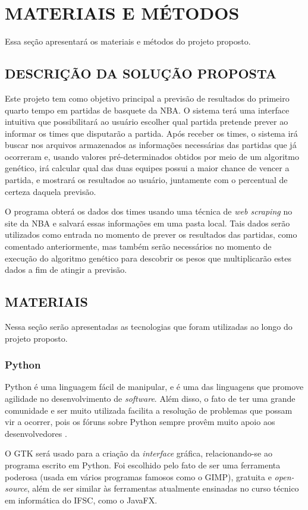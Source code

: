 \documentclass[brazilian]{ifsc-tcc}
\begin{document}
\chapter{MATERIAIS E MÉTODOS}
Essa seção apresentará os materiais e métodos do projeto proposto. 

\section{DESCRIÇÃO DA SOLUÇÃO PROPOSTA}
Este projeto tem como objetivo principal a previsão de resultados do primeiro quarto tempo em partidas de basquete da NBA. O sistema terá uma interface intuitiva que possibilitará ao usuário escolher qual partida pretende prever ao informar os times que disputarão a partida. Após receber os times, o sistema irá buscar nos arquivos armazenados as informações necessárias das partidas que já ocorreram e, usando valores pré-determinados obtidos por meio de um algoritmo genético, irá calcular qual das duas equipes possui a maior chance de vencer a partida, e mostrará os resultados ao usuário, juntamente com o percentual de certeza daquela previsão.

O programa obterá os dados dos times usando uma técnica de \textit{web scraping} no site da NBA e salvará essas informações em uma pasta local. Tais dados serão utilizados como entrada no momento de prever os resultados das partidas, como comentado anteriormente, mas também serão necessários no momento de execução do algoritmo genético para descobrir os pesos que multiplicarão estes dados a fim de atingir a previsão.

\section{MATERIAIS}
Nessa seção serão apresentadas as tecnologias que foram utilizadas ao longo do projeto proposto.

\subsection{Python}

Python é uma linguagem fácil de manipular, e é uma das linguagens que promove agilidade no desenvolvimento de \textit{software}. Além disso, o fato de ter uma grande comunidade e ser muito utilizada facilita a resolução de problemas que possam vir a ocorrer, pois os fóruns sobre Python sempre provêm muito apoio aos desenvolvedores \cite{Python}.

O GTK será usado para a criação da \textit{interface} gráfica, relacionando-se ao programa escrito em Python. Foi escolhido pelo fato de ser uma ferramenta poderosa (usada em vários programas famosos como o GIMP), gratuita e \textit{open-source}, além de ser similar às ferramentas atualmente ensinadas no curso técnico em informática do IFSC, como o JavaFX.
\end{document}
